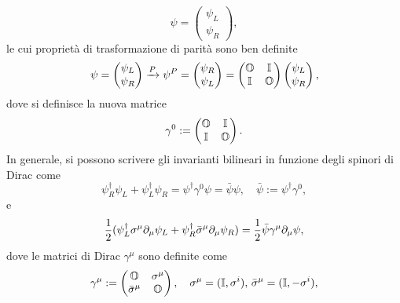 \begin{equation}
    \psi = 
    \begin{pmatrix}
        \psi_L \\
        \psi_R
    \end{pmatrix},
\end{equation}
le cui proprietà di trasformazione di parità sono ben definite
\begin{equation}
    \psi= 
    \begin{pmatrix}
        \psi_L \\
        \psi_R
    \end{pmatrix}
    \xrightarrow{P} \psi^P = 
    \begin{pmatrix}
        \psi_R \\
        \psi_L
    \end{pmatrix} =
    \begin{pmatrix}
        \mathbb{O} & \mathbb{I} \\
        \mathbb{I} & \mathbb{O}
    \end{pmatrix}
    \begin{pmatrix}
        \psi_L \\
        \psi_R
    \end{pmatrix},
\end{equation}
dove si definisce la nuova matrice
\begin{equation}
    \gamma^0 := 
    \begin{pmatrix}
        \mathbb{O} & \mathbb{I} \\
        \mathbb{I} & \mathbb{O}
    \end{pmatrix}.
\end{equation}
In generale, si possono scrivere gli invarianti bilineari in funzione degli spinori di Dirac come
\begin{equation}
    \psi_R^\dagger\psi_L + \psi_L^\dagger\psi_R = \psi^\dagger\gamma^0\psi = \bar{\psi}\psi,\quad\bar{\psi} := \psi^\dagger\gamma^0,
\end{equation}
e
\begin{equation}
    \frac{1}{2}(\psi_L^\dagger\sigma^\mu\partial_\mu\psi_L + \psi_R^\dagger\bar{\sigma}^\mu\partial_\mu\psi_R) = \frac{1}{2}\bar{\psi}\gamma^\mu\partial_\mu\psi,
\end{equation}
dove le matrici di Dirac $\gamma^\mu$ sono definite come
\begin{equation}
    \gamma^\mu := 
    \begin{pmatrix}
        \mathbb{O} & \sigma^\mu \\
        \bar{\sigma}^\mu & \mathbb{O}
    \end{pmatrix},\quad\sigma^\mu = (\mathbb{I},\sigma^i),\,\bar{\sigma}^\mu = (\mathbb{I},-\sigma^i),
\end{equation}
